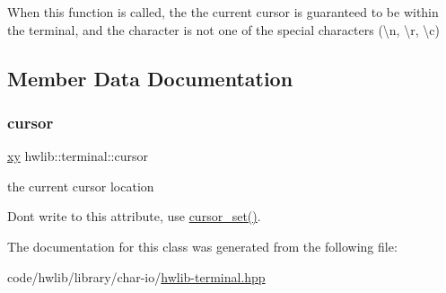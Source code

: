 When this function is called, the the current cursor is guaranteed to be within the terminal, and the character is not one of the special characters (\textbackslash{}n, \textbackslash{}r, \textbackslash{}c) 

\subsection{Member Data Documentation}
\mbox{\label{classhwlib_1_1terminal_aeb11ed01f6b2dff73d624ae17955a32e}} 
\subsubsection{\texorpdfstring{cursor}{cursor}}
{\footnotesize\ttfamily \hyperlink{classhwlib_1_1xy}{xy} hwlib\+::terminal\+::cursor}

the current cursor location

Don\textquotesingle{}t write to this attribute, use \hyperlink{classhwlib_1_1terminal_ad03a78feb552449609cacd9ffce4cb6e}{cursor\+\_\+set()}. 

The documentation for this class was generated from the following file\+:\begin{DoxyCompactItemize}
\item 
code/hwlib/library/char-\/io/\hyperlink{hwlib-terminal_8hpp}{hwlib-\/terminal.\+hpp}\end{DoxyCompactItemize}

